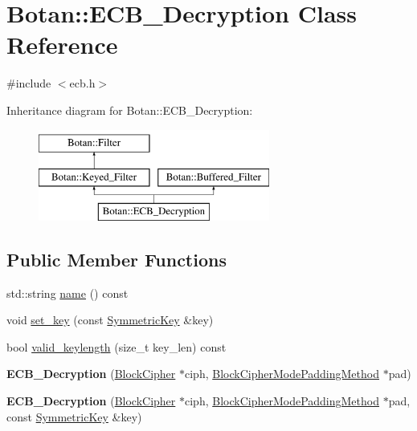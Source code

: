 \hypertarget{classBotan_1_1ECB__Decryption}{\section{Botan\-:\-:E\-C\-B\-\_\-\-Decryption Class Reference}
\label{classBotan_1_1ECB__Decryption}
}


{\ttfamily \#include $<$ecb.\-h$>$}

Inheritance diagram for Botan\-:\-:E\-C\-B\-\_\-\-Decryption\-:\begin{figure}[H]
\begin{center}
\leavevmode
\includegraphics[height=3.000000cm]{classBotan_1_1ECB__Decryption}
\end{center}
\end{figure}
\subsection*{Public Member Functions}
\begin{DoxyCompactItemize}
\item 
std\-::string \hyperlink{classBotan_1_1ECB__Decryption_a7d1ac4607a34ea28bfd9b978cfa206ec}{name} () const 
\item 
void \hyperlink{classBotan_1_1ECB__Decryption_a81b7cb4c10b891898d2cb24eb31158e4}{set\-\_\-key} (const \hyperlink{namespaceBotan_a00c78597211d5c63b63e2a57ddb96d38}{Symmetric\-Key} \&key)
\item 
bool \hyperlink{classBotan_1_1ECB__Decryption_a303d73a84d84369924b802a7dadd1e38}{valid\-\_\-keylength} (size\-\_\-t key\-\_\-len) const 
\item 
\hypertarget{classBotan_1_1ECB__Decryption_a19074161ab7fe8a25704a218f451a1ba}{{\bfseries E\-C\-B\-\_\-\-Decryption} (\hyperlink{classBotan_1_1BlockCipher}{Block\-Cipher} $\ast$ciph, \hyperlink{classBotan_1_1BlockCipherModePaddingMethod}{Block\-Cipher\-Mode\-Padding\-Method} $\ast$pad)}\label{classBotan_1_1ECB__Decryption_a19074161ab7fe8a25704a218f451a1ba}

\item 
\hypertarget{classBotan_1_1ECB__Decryption_a735d59e813912e25692b9ba56982f5de}{{\bfseries E\-C\-B\-\_\-\-Decryption} (\hyperlink{classBotan_1_1BlockCipher}{Block\-Cipher} $\ast$ciph, \hyperlink{classBotan_1_1BlockCipherModePaddingMethod}{Block\-Cipher\-Mode\-Padding\-Method} $\ast$pad, const \hyperlink{namespaceBotan_a00c78597211d5c63b63e2a57ddb96d38}{Symmetric\-Key} \&key)}\label{classBotan_1_1ECB__Decryption_a735d59e813912e25692b9ba56982f5de}

\end{DoxyCompactItemize}
